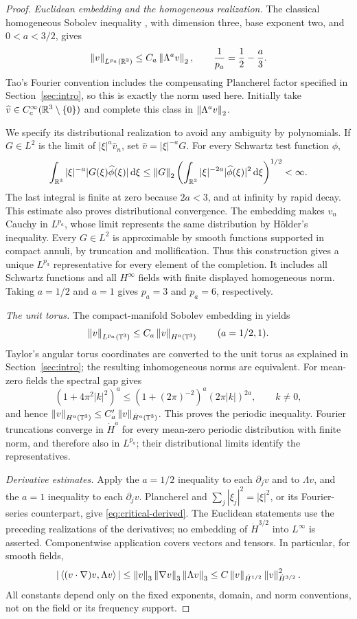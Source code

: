 \begin{proof}
\emph{Euclidean embedding and the homogeneous realization.}
The classical homogeneous Sobolev inequality
\cite[Appendix~A, equation~(A.11)]{taodispersive}, with dimension three,
base exponent two, and $0<a<3/2$, gives
\[
 \left\lVert v\right\rVert_{L^{p_a}(\mathbb R^3)}\le C_a\left\lVert\Lambda^a v\right\rVert_2,
 \qquad \frac1{p_a}=\frac12-\frac a3.
\]
Tao's Fourier convention includes the compensating Plancherel factor
specified in Section~\ref{sec:intro}, so this is exactly the norm
used here. Initially take $\widehat v\in
C_c^\infty(\mathbb R^3\setminus\{0\})$ and complete this class in
$\left\lVert\Lambda^a v\right\rVert_2$.

We specify its distributional realization to avoid any ambiguity by
polynomials. If $G\in L^2$ is the limit of $|\xi|^a\widehat v_n$, set
$\widehat v=|\xi|^{-a}G$. For every Schwartz test function $\phi$,
\[
 \int_{\mathbb R^3}|\xi|^{-a}|G(\xi)\widehat\phi(\xi)|\,\mathrm d\xi
 \le\left\lVert G\right\rVert_2
 \left(\int_{\mathbb R^3}|\xi|^{-2a}|\widehat\phi(\xi)|^2\,\mathrm d\xi\right)^{1/2}
 <\infty.
\]
The last integral is finite at zero because $2a<3$, and at infinity
by rapid decay. This estimate also proves distributional convergence.
The embedding makes $v_n$ Cauchy in $L^{p_a}$, whose limit represents
the same distribution by H\"older's inequality. Every $G\in L^2$ is
approximable by smooth functions supported in compact annuli, by
truncation and mollification. Thus this construction gives a unique
$L^{p_a}$ representative for every element of the completion.
It includes all Schwartz functions and all $H^\infty$ fields with
finite displayed homogeneous norm. Taking $a=1/2$ and $a=1$ gives
$p_a=3$ and $p_a=6$, respectively.

\emph{The unit torus.}
The compact-manifold Sobolev embedding in
\cite[Chapter~13, Proposition~6.4 and the preceding discussion]{taylor2011iii}
yields
\[
 \left\lVert v\right\rVert_{L^{p_a}(\mathbb T^3)}\le C_a\left\lVert v\right\rVert_{H^a(\mathbb T^3)}
 \qquad(a=1/2,1).
\]
Taylor's angular torus coordinates are converted to the unit torus
as explained in Section~\ref{sec:intro}; the resulting inhomogeneous
norms are equivalent. For mean-zero fields the spectral gap gives
\[
 (1+4\pi^2|k|^2)^a
 \le(1+(2\pi)^{-2})^a(2\pi|k|)^{2a},\qquad k\ne0,
\]
and hence $\left\lVert v\right\rVert_{H^a(\mathbb T^3)}\le C_a'\left\lVert v\right\rVert_{\dot H^a(\mathbb T^3)}$.
This proves the periodic inequality. Fourier truncations converge in
$\dot H^a$ for every mean-zero periodic distribution with finite norm,
and therefore also in $L^{p_a}$; their distributional limits identify
the representatives.

\emph{Derivative estimates.}
Apply the $a=1/2$ inequality to each $\partial_jv$ and to $\Lambda v$,
and the $a=1$ inequality to each $\partial_jv$. Plancherel and
$\sum_j|\xi_j|^2=|\xi|^2$, or its Fourier-series counterpart, give
\eqref{eq:critical-derived}. The Euclidean statements use the preceding
realizations of the derivatives; no embedding of $\dot H^{3/2}$ into
$L^\infty$ is asserted. Componentwise application covers vectors and
tensors. In particular, for smooth fields,
\[
 |\left\langle(v\cdot\nabla)v,\Lambda v\right\rangle|
 \le\left\lVert v\right\rVert_3\left\lVert\nabla v\right\rVert_3\left\lVert\Lambda v\right\rVert_3
 \le C\left\lVert v\right\rVert_{\dot H^{1/2}}\left\lVert v\right\rVert_{\dot H^{3/2}}^2.
\]
All constants depend only on the fixed exponents, domain, and norm
conventions, not on the field or its frequency support.
\end{proof}
